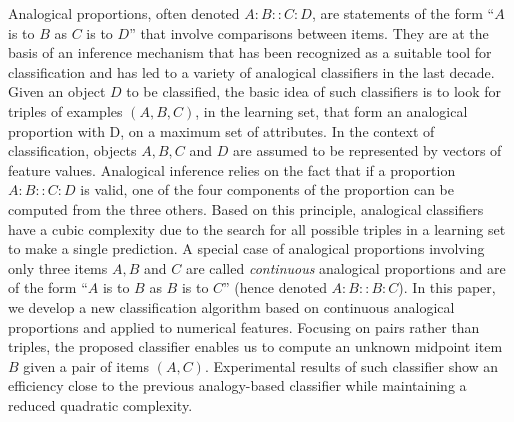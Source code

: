 
Analogical proportions, often denoted $A:B::C:D$,  are statements of the form ``$A$ is to $B$ as $C$ is to $D$'' that involve comparisons between items. They are at the basis of an inference mechanism that has been recognized as a suitable tool for classification and has led to a variety of analogical classifiers in the last decade. Given an object $D$ to be classified, the basic idea of such classifiers is to look
for triples of examples $(A, B, C)$, in the learning set, that form an analogical proportion with D, on a maximum set of attributes. In the context of classification, objects $A, B, C$ and $D$ are assumed to be represented by vectors of feature values. Analogical inference relies on the fact that if a proportion $A:B::C:D$ is valid, one of the four components of the proportion can be computed from the three others. Based on this principle, analogical classifiers have a cubic complexity due to the search for all possible triples in a learning set to make a single prediction.
A special case of analogical proportions involving only three items $A, B$ and $C$ are called \textit{continuous} analogical proportions and are of the form ``$A$ is to $B$ as $B$ is to $C$'' (hence  denoted $A:B::B:C$). In this paper, we develop a new classification algorithm based on continuous analogical proportions and applied to numerical features. Focusing on pairs rather than triples, the proposed classifier enables us to compute an unknown midpoint item $B$ given a pair of items $(A,C)$. Experimental results of such classifier show an efficiency close to the previous analogy-based classifier while maintaining a reduced quadratic complexity.


